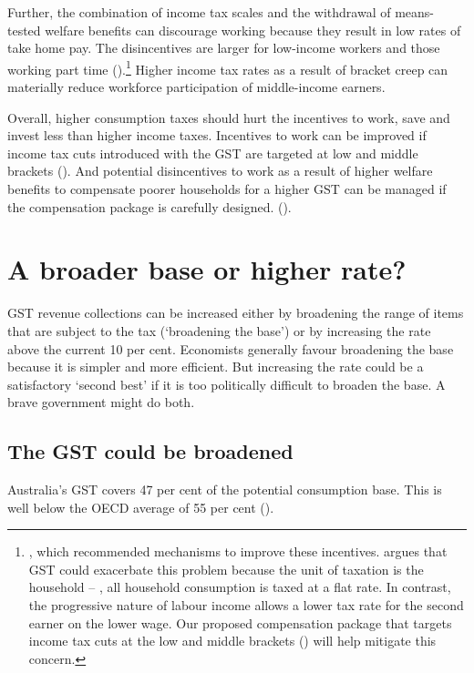 Further, the combination of income tax scales and the withdrawal of means-tested welfare benefits can discourage working because they result in low rates of take home pay. The disincentives are larger for low-income workers and those working part time ().\footnote{\textcites{ProductivityCommission2015-Tax-and-transfer-incidence}{HardingNguVuPayneEtAl2009}{Reference-Group-On-Welfare-Reform-to-the-Minister-for-Social-Services-2015}, 
which recommended mechanisms to improve these incentives. \textcite{Apps2015} argues that GST could exacerbate this problem because the unit of taxation is the household – \ie, all household consumption is taxed at a flat rate. In contrast, the progressive nature of labour income allows a lower tax rate for the second earner on the lower wage. Our proposed compensation package that targets income tax cuts at the low and middle brackets () will help mitigate this concern.}  Higher income tax rates as a result of bracket creep can materially reduce workforce participation of middle-income earners.  

Overall, higher consumption taxes should hurt the incentives to work, save and invest less than higher income taxes. Incentives to work can be improved if income tax cuts introduced with the GST are targeted at low and middle brackets (). And potential disincentives to work as a result of higher welfare benefits to compensate poorer households for a higher GST can be managed if the compensation package is carefully designed. (). 

\chapter{A broader base or higher rate?}\label{chapter:GST-2}
GST revenue collections can be increased either by broadening the range of items that are subject to the tax (‘broadening the base’) or by increasing the rate above the current 10 per cent. Economists generally favour broadening the base because it is simpler and more efficient. But increasing the rate could be a satisfactory ‘second best’ if it is too politically difficult to broaden the base. A brave government might do both. 

\section{The GST could be broadened}\label{sec:GST-2-1}
Australia’s GST covers 47 per cent of the potential consumption base. This is well below the OECD average of 55 per cent ().

